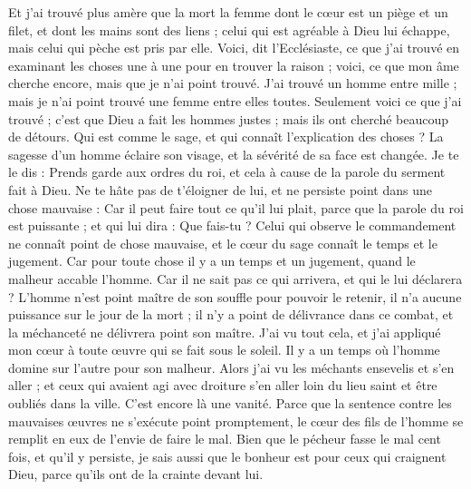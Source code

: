 \begin{multicols}{2}
Et j'ai trouvé plus amère que la mort la femme dont le cœur est un piège et un filet, et dont les mains sont des liens ; celui qui est agréable à Dieu lui échappe, mais celui qui pèche est pris par elle.
Voici, dit l'Ecclésiaste, ce que j'ai trouvé en examinant les choses une à une pour en trouver la raison ;
voici, ce que mon âme cherche encore, mais que je n'ai point trouvé. J'ai trouvé un homme entre mille ; mais je n’ai point trouvé une femme entre elles toutes.
Seulement voici ce que j'ai trouvé ; c'est que Dieu a fait les hommes justes ; mais ils ont cherché beaucoup de détours.
\VerseOne{}Qui est comme le sage, et qui connaît l’explication des choses ? La sagesse d’un homme éclaire son visage, et la sévérité de sa face est changée.
Je te le dis : Prends garde aux ordres du roi, et cela à cause de la parole du serment fait à Dieu.
Ne te hâte pas de t’éloigner de lui, et ne persiste point dans une chose mauvaise : Car il peut faire tout ce qu'il lui plait,
parce que la parole du roi est puissante ; et qui lui dira : Que fais-tu ?
Celui qui observe le commandement ne connaît point de chose mauvaise, et le cœur du sage connaît le temps et le jugement.
Car pour toute chose il y a un temps et un jugement, quand le malheur accable l'homme.
Car il ne sait pas ce qui arrivera, et qui le lui déclarera ?
L'homme n'est point maître de son souffle pour pouvoir le retenir, il n'a aucune puissance sur le jour de la mort ; il n'y a point de délivrance dans ce combat, et la méchanceté ne délivrera point son maître.
J'ai vu tout cela, et j'ai appliqué mon cœur à toute œuvre qui se fait sous le soleil. Il y a un temps où l’homme domine sur l'autre pour son malheur.
Alors j'ai vu les méchants ensevelis et s’en aller ; et ceux qui avaient agi avec droiture s’en aller loin du lieu saint et être oubliés dans la ville. C’est encore là une vanité.
Parce que la sentence contre les mauvaises œuvres ne s'exécute point promptement, le cœur des fils de l’homme se remplit en eux de l’envie de faire le mal.
Bien que le pécheur fasse le mal cent fois, et qu’il y persiste, je sais aussi que le bonheur est pour ceux qui craignent Dieu, parce qu’ils ont de la crainte devant lui.

\end{multicols}
